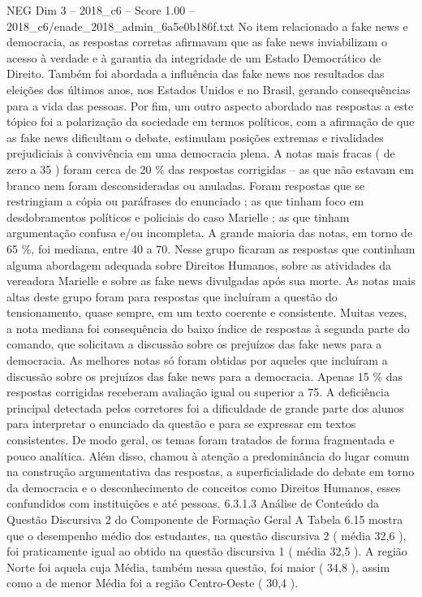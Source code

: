\begin{textsample}{NEG Dim 3 – 2018\_c6 – Score 1.00 – 2018\_c6/enade\_2018\_admin\_6a5e0b186f.txt}
No item relacionado a fake news e democracia, as respostas corretas afirmavam que as fake news inviabilizam o acesso à verdade e à garantia da integridade de um Estado Democrático de Direito.
Também foi abordada a influência das fake news nos resultados das eleições dos últimos anos, nos Estados Unidos e no Brasil, gerando consequências para a vida das pessoas.
Por fim, um outro aspecto abordado nas respostas a este tópico foi a polarização da sociedade em termos políticos, com a afirmação de que as fake news dificultam o debate, estimulam posições extremas e rivalidades prejudiciais à convivência em uma democracia plena.
A notas mais fracas ( de zero a 35 ) foram cerca de 20 \% das respostas corrigidas – as que não estavam em branco nem foram desconsideradas ou anuladas.
Foram respostas que se restringiam a cópia ou paráfrases do enunciado ; as que tinham foco em desdobramentos políticos e policiais do caso Marielle ; as que tinham argumentação confusa e/ou incompleta.
A grande maioria das notas, em torno de 65 \%, foi mediana, entre 40 a 70.
Nesse grupo ficaram as respostas que continham alguma abordagem adequada sobre Direitos Humanos, sobre as atividades da vereadora Marielle e sobre as fake news divulgadas após sua morte.
As notas mais altas deste grupo foram para respostas que incluíram a questão do tensionamento, quase sempre, em um texto coerente e consistente.
Muitas vezes, a nota mediana foi consequência do baixo índice de respostas à segunda parte do comando, que solicitava a discussão sobre os prejuízos das fake news para a democracia.
As melhores notas só foram obtidas por aqueles que incluíram a discussão sobre os prejuízos das fake news para a democracia.
Apenas 15 \% das respostas corrigidas receberam avaliação igual ou superior a 75.
A deficiência principal detectada pelos corretores foi a dificuldade de grande parte dos alunos para interpretar o enunciado da questão e para se expressar em textos consistentes.
De modo geral, os temas foram tratados de forma fragmentada e pouco analítica.
Além disso, chamou à atenção a predominância do lugar comum na construção argumentativa das respostas, a superficialidade do debate em torno da democracia e o desconhecimento de conceitos como Direitos Humanos, esses confundidos com instituições e até pessoas. 6.3.1.3 Análise de Conteúdo da Questão Discursiva 2 do Componente de Formação Geral A Tabela 6.15 mostra que o desempenho médio dos estudantes, na questão discursiva 2 ( média 32,6 ), foi praticamente igual ao obtido na questão discursiva 1 ( média 32,5 ).
A região Norte foi aquela cuja Média, também nessa questão, foi maior ( 34,8 ), assim como a de menor Média foi a região Centro-Oeste ( 30,4 ).

\end{textsample}
